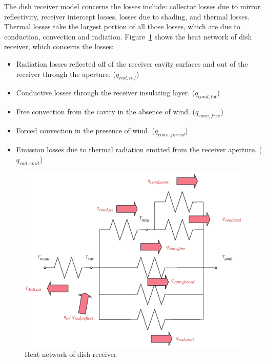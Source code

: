 \documentclass{article}
\begin{document}

The dish receiver model concerns the losses include: collector losses due to mirror reflectivity, receiver intercept losses, losses due to shading, and thermal losses. Thermal losses take the largest portion of all those losses, which are due to conduction, convection and radiation. Figure~\ref{fig:thermal-lose} shows the heat network of dish receiver, which concerns the losses:
\begin{itemize}
	\item Radiation losses reflected off of the receiver cavity surfaces and out of the receiver through the aperture. ($q_{rad,ref}$)
	\item Conductive losses through the receiver insulating layer. ($q_{cond,tot}$)
	\item Free convection from the cavity in the absence of wind. ($q_{conv,free}$)
	\item Forced convection in the presence of wind. ($q_{conv,forced}$)
	\item Emission losses due to thermal radiation emitted from the receiver aperture. ($q_{rad,emit}$)
\end{itemize}

\noindent \begin{figure}[htbp]
\begin{center}
	\includegraphics[width = 0.7\columnwidth]{./graphics/thermalLosses}
	\caption{Heat network of dish receiver}
	\label{fig:thermal-lose}
\end{center}
\end{figure}
\end{document}
